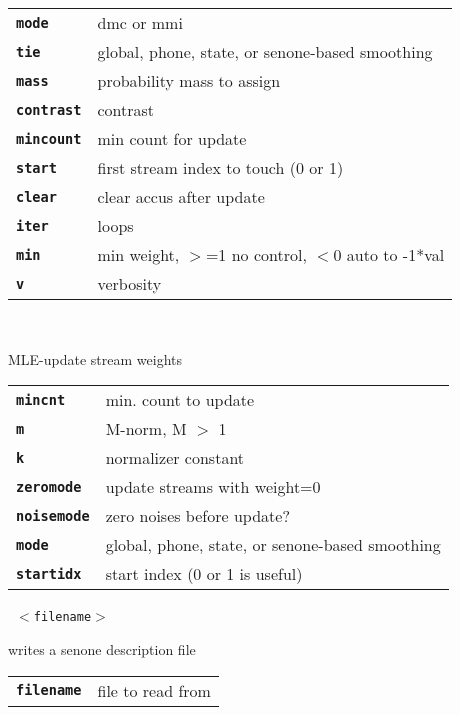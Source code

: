\begin{description}
\begin{description}
      \begin{tabular}{ll}
 \texttt{\textbf{mode}} &      dmc or mmi  \\
 \texttt{\textbf{tie}} &       global, phone, state, or senone-based smoothing  \\
 \texttt{\textbf{mass}} &      probability mass to assign  \\
 \texttt{\textbf{contrast}} &  contrast  \\
 \texttt{\textbf{mincount}} &  min count for update  \\
 \texttt{\textbf{start}} &     first stream index to touch (0 or 1)  \\
 \texttt{\textbf{clear}} &     clear accus after update  \\
 \texttt{\textbf{iter}} &      loops  \\
 \texttt{\textbf{min}} &       min weight, $>$=1 no control, $<$0 auto to -1*val  \\
 \texttt{\textbf{v}} &         verbosity  \\
      \end{tabular}
       \texttt{       } \

        MLE-update stream weights

      \begin{tabular}{ll}
 \texttt{\textbf{mincnt}} &     min. count to update  \\
 \texttt{\textbf{m}} &          M-norm, M $>$ 1  \\
 \texttt{\textbf{k}} &          normalizer constant  \\
 \texttt{\textbf{zeromode}} &   update streams with weight=0  \\
 \texttt{\textbf{noisemode}} &  zero noises before update?  \\
 \texttt{\textbf{mode}} &       global, phone, state, or senone-based smoothing  \\
 \texttt{\textbf{startidx}} &   start index (0 or 1 is useful)  \\
      \end{tabular}
       \texttt{ $<$filename$>$} \

        writes a senone description file

      \begin{tabular}{ll}
 \texttt{\textbf{filename}} &  file to read from  \\
      \end{tabular}
    \end{description}


\end{description}
